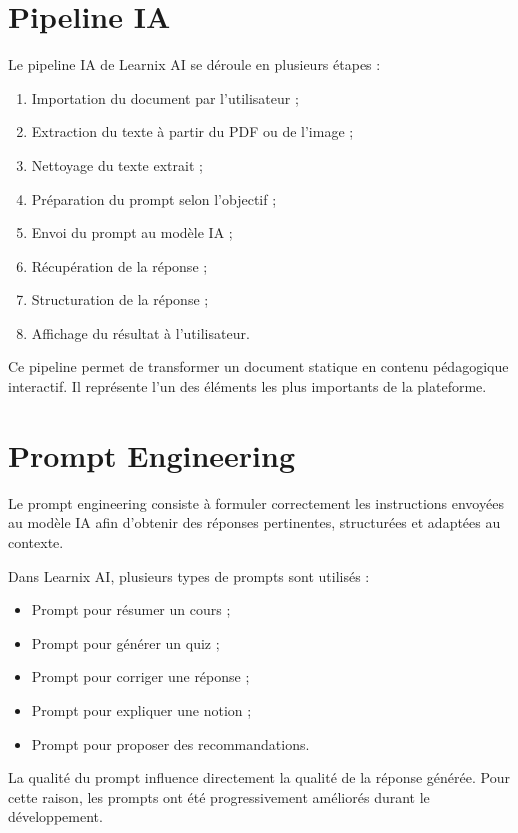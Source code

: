 \documentclass[12pt,a4paper]{report}
\begin{document}
\section{Pipeline IA}

Le pipeline IA de Learnix AI se déroule en plusieurs étapes :

\begin{enumerate}
    \item Importation du document par l'utilisateur ;
    \item Extraction du texte à partir du PDF ou de l'image ;
    \item Nettoyage du texte extrait ;
    \item Préparation du prompt selon l'objectif ;
    \item Envoi du prompt au modèle IA ;
    \item Récupération de la réponse ;
    \item Structuration de la réponse ;
    \item Affichage du résultat à l'utilisateur.
\end{enumerate}

Ce pipeline permet de transformer un document statique en contenu pédagogique
interactif. Il représente l'un des éléments les plus importants de la plateforme.

\section{Prompt Engineering}

Le prompt engineering consiste à formuler correctement les instructions envoyées
au modèle IA afin d'obtenir des réponses pertinentes, structurées et adaptées au
contexte.

Dans Learnix AI, plusieurs types de prompts sont utilisés :

\begin{itemize}
    \item Prompt pour résumer un cours ;
    \item Prompt pour générer un quiz ;
    \item Prompt pour corriger une réponse ;
    \item Prompt pour expliquer une notion ;
    \item Prompt pour proposer des recommandations.
\end{itemize}

La qualité du prompt influence directement la qualité de la réponse générée.
Pour cette raison, les prompts ont été progressivement améliorés durant le
développement.
\end{document}
